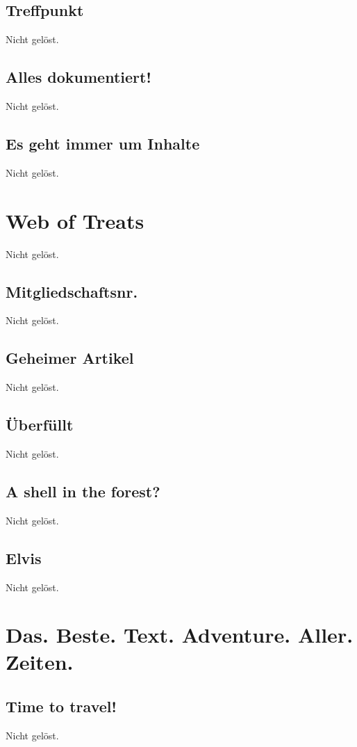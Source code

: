 \documentclass[12pt,a4paper,titlepage,oneside]{scrartcl}
\begin{document}
\subsection{Treffpunkt}
Nicht gelöst.

\subsection{Alles dokumentiert!}
Nicht gelöst.

\subsection{Es geht immer um Inhalte}
Nicht gelöst.


\section{Web of Treats}
Nicht gelöst.

\subsection{Mitgliedschaftsnr.}
Nicht gelöst.

\subsection{Geheimer Artikel}
Nicht gelöst.

\subsection{\"Uberf\"ullt}
Nicht gelöst.

\subsection{A shell in the forest?}
Nicht gelöst.

\subsection{Elvis}
Nicht gelöst.


\section{Das. Beste. Text. Adventure. Aller. Zeiten.}

\subsection{Time to travel!}
Nicht gelöst.
\end{document}
